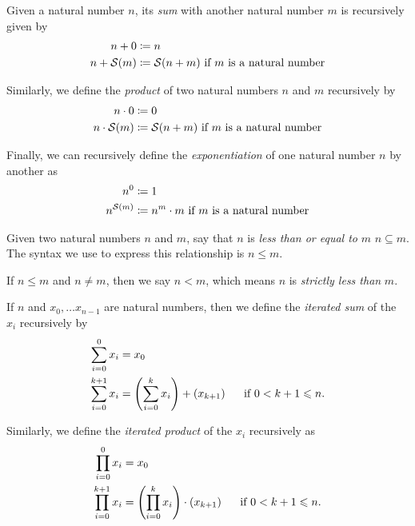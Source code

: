 \begin{definition}
    Given a natural number \(n\),
    its \emph{sum} with another natural number \(m\) is recursively given by
    \begin{align*}
        n + 0 &\defn n\\
        n + \successor{m} &\defn \successor{n + m} \text{ if } m \text{ is a natural number}
    \end{align*}

    Similarly, we define the \emph{product} of two natural numbers \(n\) and \(m\) recursively by
    \begin{align*}
        n \cdot 0 &\defn 0\\
        n \cdot \successor{m} &\defn \successor{n + m} \text{ if } m \text{ is a natural number}
    \end{align*}

    Finally, we can recursively define the \emph{exponentiation} of one natural number \(n\) by another as
    \begin{align*}
        n^{0} &\defn 1\\
        n^{\successor{m}} &\defn n^{m} \cdot m \text{ if } m \text{ is a natural number}
    \end{align*}
\end{definition}

\begin{definition}
    Given two natural numbers \(n\) and \(m\),
    say that \(n\) is \emph{less than or equal to} \(m\) \iffbydefn \(n \subseteq m\).
    The syntax we use to express this relationship is \(n \leq m\).

    If \(n \leq m\) and \(n \neq m\), then we say \(n < m\),
    which means \(n\) is \emph{strictly less than} \(m\).
\end{definition}

\begin{definition}
    If \(n\) and \(x_0, \dots x_{n - 1}\) are natural numbers,
    then we define the \emph{iterated sum} of the \(x_i\) recursively by
    \begin{align*}
        \sum_{i = 0}^{0}x_i &= x_0\\
        \sum_{i = 0}^{k + 1}x_i &= \pn*{\sum_{i = 0}^{k}x_i} + \pn*{x_{k + 1}}~~~~\text{ if } 0 < k + 1 \leq n.
    \end{align*}

    Similarly, we define the \emph{iterated product} of the \(x_i\) recursively as
    \begin{align*}
        \prod_{i = 0}^{0}x_i &= x_0\\
        \prod_{i = 0}^{k + 1}x_i &= \pn*{\prod_{i = 0}^{k}x_i} \cdot \pn*{x_{k + 1}}~~~~\text{ if } 0 < k + 1 \leq n.
    \end{align*}
\end{definition}

